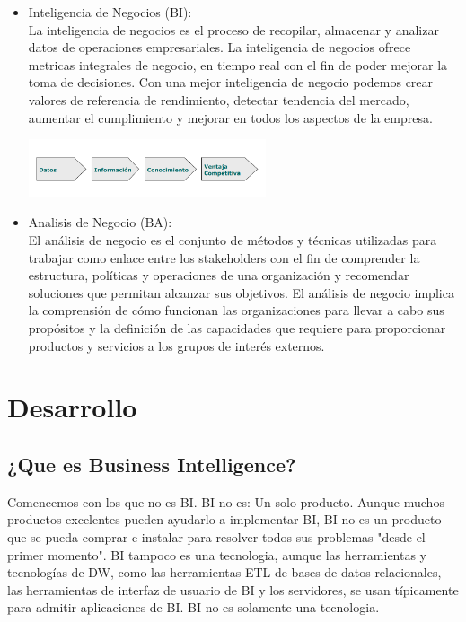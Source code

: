 \documentclass[twoside,twocolumn]{article}
\begin{document}
\begin{itemize}
\item Inteligencia de Negocios (BI): \\ 
La inteligencia de negocios es el proceso de recopilar, almacenar y analizar datos de operaciones empresariales. La inteligencia de negocios ofrece metricas integrales de negocio,
en tiempo real con el fin de poder mejorar la toma de decisiones. Con una mejor inteligencia de negocio podemos crear valores de referencia de rendimiento, detectar tendencia del mercado,
aumentar el cumplimiento y mejorar en todos los aspectos de la empresa.
\begin{center}
	\includegraphics[width=7cm]{./Imagenes/bi} 
\end{center}

\item Analisis de Negocio (BA): \\ 
El análisis de negocio es el conjunto de métodos y técnicas utilizadas para trabajar como enlace entre los stakeholders con el fin de comprender la estructura, políticas y operaciones de una organización y recomendar soluciones que permitan alcanzar sus objetivos. El análisis de negocio implica la comprensión de cómo funcionan las organizaciones para llevar a cabo sus propósitos y la definición de las capacidades que requiere para proporcionar productos y servicios a los grupos de interés externos.

\end{itemize}




\section{Desarrollo}

\subsection{¿Que es Business Intelligence?}
Comencemos con los que no es BI. BI no es:
Un solo producto. Aunque muchos productos excelentes pueden ayudarlo a implementar BI, BI no es un producto que se pueda comprar e instalar para resolver todos sus problemas "desde el primer momento". BI tampoco es una tecnologia, aunque las herramientas y tecnologías de DW, como las herramientas ETL de bases de datos relacionales, las herramientas de interfaz de usuario de BI y los servidores, se usan típicamente para admitir aplicaciones de BI. BI no es solamente una tecnologia.
\end{document}
